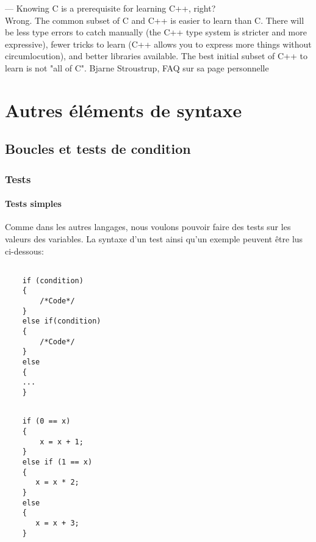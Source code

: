 \begin{savequote}
--- Knowing C is a prerequisite for learning C++, right?\\

Wrong. The common subset of C and C++ is easier to learn than C. There will be
less type errors to catch manually (the C++ type system is stricter and more
expressive), fewer tricks to learn (C++ allows you to express more things
without circumlocution), and better libraries available.  The best initial
subset of C++ to learn is not "all of C".  Bjarne Stroustrup, FAQ sur
sa page personnelle \end{savequote}

\chapter{Autres \'el\'ements de syntaxe }
\label{chapter:elementsdesyntaxe}

\section{Boucles et tests de condition}
\subsection{Tests}
\subsubsection{Tests simples}

Comme dans les autres langages, nous voulons pouvoir faire des tests
sur les valeurs des variables. La syntaxe d'un test ainsi qu'un exemple peuvent \^etre lus ci-dessous:\\

\begin{DDbox}{\linewidth}
\begin{minipage}{0.45\linewidth}
    \begin{lstlisting}[caption=Syntaxe d'un test]

    if (condition)
    {
        /*Code*/
    }
    else if(condition)
    {
        /*Code*/
    }
    else
    {
    ...
    }

    \end{lstlisting}
\end{minipage}
\qquad
\begin{minipage}{0.45\linewidth}
    \begin{lstlisting}[caption=Exemple de test]

    if (0 == x)
    {
        x = x + 1;
    }
    else if (1 == x)
    {
       x = x * 2;
    }
    else
    {
       x = x + 3;
    }

    \end{lstlisting}
\end{minipage}
\end{DDbox}

